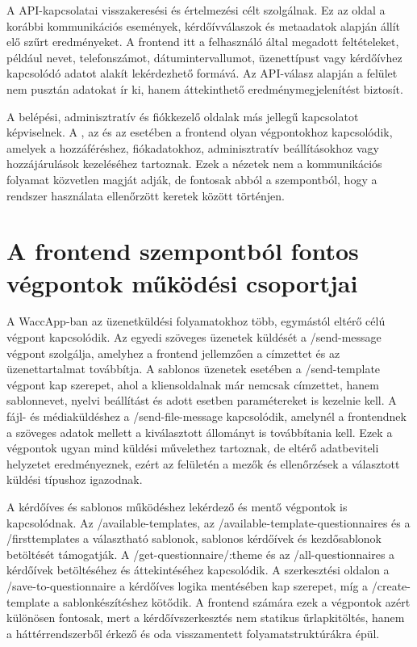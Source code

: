 A  API-kapcsolatai visszakeresési és értelmezési célt szolgálnak. Ez az oldal a korábbi kommunikációs események, kérdőívválaszok és metaadatok alapján állít elő szűrt eredményeket. A frontend itt a felhasználó által megadott feltételeket, például nevet, telefonszámot, dátumintervallumot, üzenettípust vagy kérdőívhez kapcsolódó adatot alakít lekérdezhető formává. Az API-válasz alapján a felület nem pusztán adatokat ír ki, hanem áttekinthető eredménymegjelenítést biztosít. 

A belépési, adminisztratív és fiókkezelő oldalak más jellegű kapcsolatot képviselnek. A , az  és az  esetében a frontend olyan végpontokhoz kapcsolódik, amelyek a hozzáféréshez, fiókadatokhoz, adminisztratív beállításokhoz vagy hozzájárulások kezeléséhez tartoznak. Ezek a nézetek nem a kommunikációs folyamat közvetlen magját adják, de fontosak abból a szempontból, hogy a rendszer használata ellenőrzött keretek között történjen. 

\section{A frontend szempontból fontos végpontok működési csoportjai}

A WaccApp-ban az üzenetküldési folyamatokhoz több, egymástól eltérő célú végpont kapcsolódik. Az egyedi szöveges üzenetek küldését a /send-message végpont szolgálja, amelyhez a frontend jellemzően a címzettet és az üzenettartalmat továbbítja. A sablonos üzenetek esetében a /send-template végpont kap szerepet, ahol a kliensoldalnak már nemcsak címzettet, hanem sablonnevet, nyelvi beállítást és adott esetben paramétereket is kezelnie kell. A fájl- és médiaküldéshez a /send-file-message kapcsolódik, amelynél a frontendnek a szöveges adatok mellett a kiválasztott állományt is továbbítania kell. Ezek a végpontok ugyan mind küldési művelethez tartoznak, de eltérő adatbeviteli helyzetet eredményeznek, ezért az  felületén a mezők és ellenőrzések a választott küldési típushoz igazodnak. 

A kérdőíves és sablonos működéshez lekérdező és mentő végpontok is kapcsolódnak. Az /available-templates, az /available-template-questionnaires és a /firsttemplates a választható sablonok, sablonos kérdőívek és kezdősablonok betöltését támogatják. A /get-questionnaire/:theme és az /all-questionnaires a kérdőívek betöltéséhez és áttekintéséhez kapcsolódik. A szerkesztési oldalon a /save-to-questionnaire a kérdőíves logika mentésében kap szerepet, míg a /create-template a sablonkészítéshez kötődik. A frontend számára ezek a végpontok azért különösen fontosak, mert a kérdőívszerkesztés nem statikus űrlapkitöltés, hanem a háttérrendszerből érkező és oda visszamentett folyamatstruktúrákra épül. 

